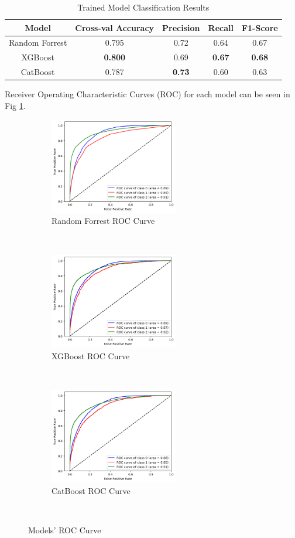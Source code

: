 \documentclass[conference]{IEEEtran}
\begin{document}
\begin{table}[H]
  \centering
  \caption{Trained Model Classification Results}
  \label{tab:jason_model}
  \begin{tabular}{|c|c|c|c|c|}
    \hline
    \textbf{Model} & \textbf{Cross-val Accuracy} & \textbf{Precision} & \textbf{Recall} &\textbf{F1-Score} \\ \hline
    Random Forrest	& 0.795 & 0.72 & 0.64 & 0.67\\
    \hline
    XGBoost &\textbf{0.800} & 0.69 & \textbf{0.67} & \textbf{0.68} \\
    \hline
    CatBoost & 0.787 & \textbf{0.73} & 0.60 & 0.63 \\
    \hline
  \end{tabular}
\end{table}

Receiver Operating Characteristic Curves (ROC) for each model can be seen in Fig \ref{fig:roc_curve}.

\begin{figure}[t!]
  \centering
  \begin{subfigure}[t]{0.3\textwidth}
      \centering
      \includegraphics[height=1.65in]{figures/jason_rf.png}
      \caption{Random Forrest ROC Curve}
  \end{subfigure}%
  ~
  \begin{subfigure}[t]{0.3\textwidth}
      \centering
      \includegraphics[height=1.65in]{figures/jason_xg.png}
      \caption{XGBoost ROC Curve}
  \end{subfigure}
  ~
  \begin{subfigure}[t]{0.3\textwidth}
      \centering
      \includegraphics[height=1.65in]{figures/jason_cat.png}
      \caption{CatBoost ROC Curve}
  \end{subfigure}
  ~
  \caption{Models' ROC Curve}
  \label{fig:roc_curve}
\end{figure}
\end{document}
